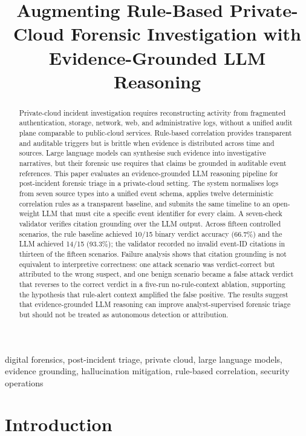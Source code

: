 \documentclass[conference]{IEEEtran}
\title{Augmenting Rule-Based Private-Cloud Forensic Investigation with Evidence-Grounded LLM Reasoning}
\author{%
  \IEEEauthorblockN{Md.~Nazmul Hasan}
}
\begin{document}
\maketitle

\begin{abstract}
Private-cloud incident investigation requires reconstructing activity from fragmented authentication, storage, network, web, and administrative logs, without a unified audit plane comparable to public-cloud services. Rule-based correlation provides transparent and auditable triggers but is brittle when evidence is distributed across time and sources. Large language models can synthesise such evidence into investigative narratives, but their forensic use requires that claims be grounded in auditable event references. This paper evaluates an evidence-grounded LLM reasoning pipeline for post-incident forensic triage in a private-cloud setting. The system normalises logs from seven source types into a unified event schema, applies twelve deterministic correlation rules as a transparent baseline, and submits the same timeline to an open-weight LLM that must cite a specific event identifier for every claim. A seven-check validator verifies citation grounding over the LLM output. Across fifteen controlled scenarios, the rule baseline achieved 10/15 binary verdict accuracy (66.7\%) and the LLM achieved 14/15 (93.3\%); the validator recorded no invalid event-ID citations in thirteen of the fifteen scenarios. Failure analysis shows that citation grounding is not equivalent to interpretive correctness: one attack scenario was verdict-correct but attributed to the wrong suspect, and one benign scenario became a false attack verdict that reverses to the correct verdict in a five-run no-rule-context ablation, supporting the hypothesis that rule-alert context amplified the false positive. The results suggest that evidence-grounded LLM reasoning can improve analyst-supervised forensic triage but should not be treated as autonomous detection or attribution.
\end{abstract}

\begin{IEEEkeywords}
digital forensics, post-incident triage, private cloud, large language models, evidence grounding, hallucination mitigation, rule-based correlation, security operations
\end{IEEEkeywords}

\section{Introduction}
\label{sec:intro}
\end{document}
